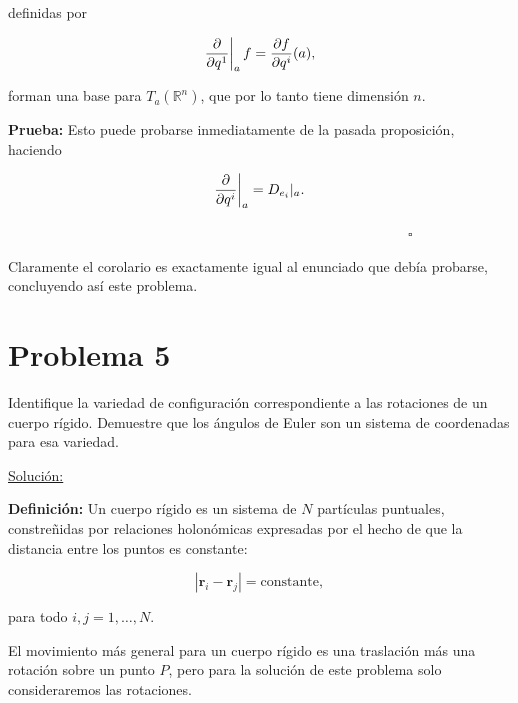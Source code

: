 \documentclass[a4paper,10pt]{article}
\numberwithin{equation}{section}
\newcommand{\zerodel}{.\kern-\nulldelimiterspace}
\newcommand{\definicion}{\textbf{Definición: }}
\newcommand{\prueba}{\textbf{Prueba: }}
\begin{document}
definidas por 

\begin{equation}
  \left\zerodel\frac{\partial}{\partial q^1}\right|_a f = 
  \frac{\partial f}{\partial q^i}(a),
\end{equation}

forman una base para $T_a(\mathbb{R}^n)$, que por lo tanto tiene 
dimensión $n$.

\vspace{.3cm}

\prueba Esto puede probarse inmediatamente de la pasada proposición, 
haciendo 

\begin{equation}
 \left\zerodel\frac{\partial}{\partial q^i}\right|_a = D_{e_{i}}|_a. 
\end{equation}

$\hspace{12cm} \square$

Claramente el corolario es exactamente igual al enunciado que debía 
probarse, concluyendo así este problema.

\section{Problema 5}

Identifique la variedad de configuración correspondiente a las rotaciones de un cuerpo 
rígido. Demuestre que los ángulos de Euler son un sistema de coordenadas para esa 
variedad.

\vspace{.3cm}

\underline{Solución:} \vspace{.3cm}

\definicion Un cuerpo rígido es un sistema de $N$ partículas puntuales, constreñidas 
por relaciones holonómicas expresadas por el hecho de que la distancia entre los 
puntos es constante:

\begin{equation}
 |\mathbf{r}_i - \mathbf{r}_j| = \text{constante},
\end{equation}

para todo $i,j = 1,\dots,N$.

\vspace{.3cm}

El movimiento más general para un cuerpo rígido es una traslación más una rotación 
sobre un punto $P$, pero para la solución de este problema solo consideraremos las 
rotaciones.

\vspace{.3cm}
\end{document}
